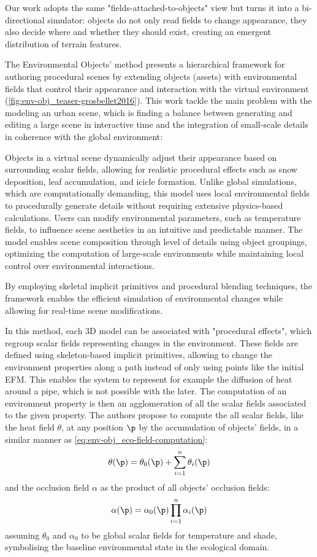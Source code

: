 Our work adopts the same "fields-attached-to-objects" view but turns it into a bi-directional simulator: objects do not only read fields to change appearance, they also decide where and whether they should exist, creating an emergent distribution of terrain features.


The Environmental Objects' method presents a hierarchical framework for authoring procedural scenes by extending objects (assets) with environmental fields that control their appearance and interaction with the virtual environment (\cref{fig:env-obj_teaser-grosbellet2016}). This work tackle the main problem with the modeling an urban scene, which is finding a balance between generating and editing a large scene in interactive time and the integration of small-scale details in coherence with the global environment: 
\begin{Itemize}
    \Item{} Objects in a virtual scene dynamically adjust their appearance based on surrounding scalar fields, allowing for realistic procedural effects such as snow deposition, leaf accumulation, and icicle formation. Unlike global simulations, which are computationally demanding, this model uses local environmental fields to procedurally generate details without requiring extensive physics-based calculations.
    \Item{} Users can modify environmental parameters, such as temperature fields, to influence scene aesthetics in an intuitive and predictable manner. The model enables scene composition through level of details using object groupings, optimizing the computation of large-scale environments while maintaining local control over environmental interactions.
\end{Itemize}
By employing skeletal implicit primitives and procedural blending techniques, the framework enables the efficient simulation of environmental changes while allowing for real-time scene modifications. 

In this method, each 3D model can be associated with "procedural effects", which regroup scalar fields representing changes in the environment. These fields are defined using skeleton-based implicit primitives, allowing to change the environment properties along a path instead of only using points like the initial EFM. This enables the system to represent for example the diffusion of heat around a pipe, which is not possible with the later. The computation of an environment property is then an agglomeration of all the scalar fields associated to the given property. The authors propose to compute the all scalar fields, like the heat field $\theta$, at any position $\p$ by the accumulation of objects' fields, in a similar manner as \cref{eq:env-obj_eco-field-computation}: 
\begin{align}
    \theta(\p) = \theta_0(\p) + \sum_{i=1}^{n}{ \theta_i(\p)}
\end{align}
and the occlusion field $\alpha$ as the product of all objects' occlusion fields:
\begin{align}
    \alpha(\p) = \alpha_0(\p) \prod_{i=1}^{n}{\alpha_i(\p)}
\end{align}
assuming $\theta_0$ and $\alpha_0$ to be global scalar fields for temperature and shade, symbolising the baseline environmental state in the ecological domain.

